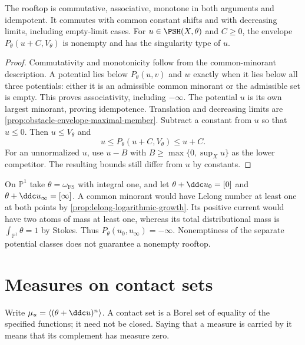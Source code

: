 \begin{proposition}\label{prop:rooftop-algebra}
The rooftop is commutative, associative, monotone in both arguments and idempotent. It commutes with common constant shifts and with decreasing limits, including empty-limit cases. For $u\in\PSH(X,\theta)$ and $C\geq0$, the envelope $P_\theta(u+C,V_\theta)$ is nonempty and has the singularity type of $u$.
\end{proposition}
\begin{proof}
Commutativity and monotonicity follow from the common-minorant description. A potential lies below $P_\theta(u,v)$ and $w$ exactly when it lies below all three potentials: either it is an admissible common minorant or the admissible set is empty. This proves associativity, including $-\infty$. The potential $u$ is its own largest minorant, proving idempotence. Translation and decreasing limits are \cref{prop:obstacle-envelope-maximal-member}. Subtract a constant from $u$ so that $u\leq0$. Then $u\leq V_\theta$ and
\[
 u\leq P_\theta(u+C,V_\theta)\leq u+C.
\]
For an unnormalized $u$, use $u-B$ with $B\geq\max\{0,\sup_Xu\}$ as the lower competitor. The resulting bounds still differ from $u$ by constants.
\end{proof}

\begin{example}\label{ex:empty-rooftop-projective-line}
On $\mathbb P^1$ take $\theta=\omega_{\mathrm{FS}}$ with integral one, and let $\theta+\ddc u_0=[0]$ and $\theta+\ddc u_\infty=[\infty]$. A common minorant would have Lelong number at least one at both points by \cref{prop:lelong-logarithmic-growth}. Its positive current would have two atoms of mass at least one, whereas its total distributional mass is $\int_{\mathbb P^1}\theta=1$ by Stokes. Thus $P_\theta(u_0,u_\infty)=-\infty$. Nonemptiness of the separate potential classes does not guarantee a nonempty rooftop.
\end{example}

\section{Measures on contact sets}
\label{sec:envelope-contact-measures}
Write $\mu_u=\langle(\theta+\ddc u)^n\rangle$. A contact set is a Borel set of equality of the specified functions; it need not be closed. Saying that a measure is carried by it means that its complement has measure zero.

